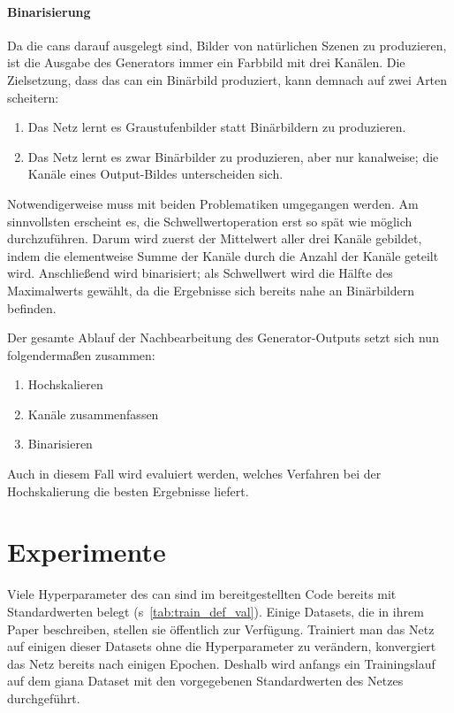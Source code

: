 \paragraph{Binarisierung}

Da die \glspl{can} darauf ausgelegt sind, Bilder von natürlichen Szenen zu produzieren, ist die Ausgabe des Generators immer ein Farbbild mit drei Kanälen.
Die Zielsetzung, dass das \gls{can} ein Binärbild produziert, kann demnach auf zwei Arten scheitern:

\begin{enumerate}
	\item Das Netz lernt es Graustufenbilder statt Binärbildern zu produzieren.
	\item Das Netz lernt es zwar Binärbilder zu produzieren, aber nur kanalweise; die Kanäle eines Output-Bildes unterscheiden sich.
\end{enumerate}

Notwendigerweise muss mit beiden Problematiken umgegangen werden.
Am sinnvollsten erscheint es, die Schwellwertoperation erst so spät wie möglich durchzuführen.
Darum wird zuerst der Mittelwert aller drei Kanäle gebildet, indem die elementweise Summe der Kanäle durch die Anzahl der Kanäle geteilt wird.
Anschließend wird binarisiert; als Schwellwert wird die Hälfte des Maximalwerts gewählt, da die Ergebnisse sich bereits nahe an Binärbildern befinden.

Der gesamte Ablauf der Nachbearbeitung des Generator-Outputs setzt sich nun folgendermaßen zusammen:

\begin{enumerate}
	\item Hochskalieren
	\item Kanäle zusammenfassen
	\item Binarisieren
\end{enumerate}

Auch in diesem Fall wird evaluiert werden, welches Verfahren bei der Hochskalierung die besten Ergebnisse liefert.



\section{Experimente}

Viele Hyperparameter des \gls{can} sind im bereitgestellten Code bereits mit Standardwerten belegt (s~\autoref{tab:train_def_val}).
Einige Datasets, die \citeauthor{Isola.2017} in ihrem Paper beschreiben, stellen sie öffentlich zur Verfügung.
Trainiert man das Netz auf einigen dieser Datasets ohne die Hyperparameter zu verändern, konvergiert das Netz bereits nach einigen Epochen.
Deshalb wird anfangs ein Trainingslauf auf dem \gls{giana} Dataset mit den vorgegebenen Standardwerten des Netzes durchgeführt.

